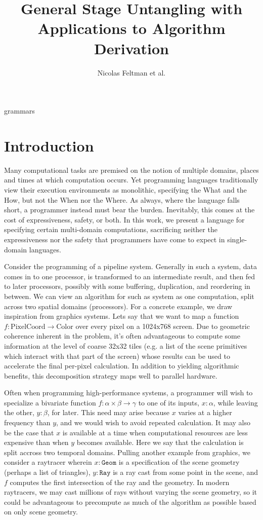 \documentclass{article}
\title{\Large\textbf{General Stage Untangling with Applications to Algorithm Derivation}}
\author{Nicolas Feltman et al.}
\begin{document}
\maketitle

 {grammars}

\section{Introduction}

Many computational tasks are premised on the notion of multiple domains, places and times at which computation occurs.  Yet programming languages traditionally view their execution environments as monolithic, specifying the What and the How, but not the When nor the Where.   As always, where the language falls short, a programmer instead must bear the burden.  Inevitably, this comes at the cost of expressiveness, safety, or both.  In this work, we present a language for specifying certain multi-domain computations, sacrificing neither the expressiveness nor the safety that programmers have come to expect in single-domain languages.

Consider the programming of a pipeline system.  Generally in such a system, data comes in to one processor, is transformed to an intermediate result, and then fed to later processors, possibly with some buffering, duplication, and reordering in between.  We can view an algorithm for such as system as one computation, split across two spatial domains (processors).  For a concrete example, we draw inspiration from graphics systems.  Lets say that we want to map a function $f : \mathrm{PixelCoord} \to \mathrm{Color}$ over every pixel on a 1024x768 screen.   Due to geometric coherence inherent in the problem, it's often advantageous to compute some information at the level of coarse 32x32 tiles (e.g. a list of the scene primitives which interact with that part of the screen) whose results can be used to accelerate the final per-pixel calculation.  In addition to yielding algorithmic benefits, this decomposition strategy maps well to parallel hardware.

Often when programming high-performance systems, a programmer will wish to specialize a bivariate function $f : \alpha \times \beta \to \gamma$ to one of its inputs, $x : \alpha$, while leaving the other, $y : \beta$, for later.  This need may arise because $x$ varies at a higher frequency than $y$, and we would wish to avoid repeated calculation. It may also be the case that $x$ is available at a time when computational resources are less expensive than when $y$ becomes available.  Here we say that the calculation is split accross two temporal domains.  Pulling another example from graphics, we consider a raytracer wherein $x : \mathtt{Geom}$ is a specification of the scene geometry (perhaps a list of triangles), $y : \mathtt{Ray}$ is a ray cast from some point in the scene, and $f$ computes the first intersection of the ray and the geometry.  In modern raytracers, we may cast millions of rays without varying the scene geometry, so it could be advantageous to precompute as much of the algorithm as possible based on only scene geometry.
\end{document}
